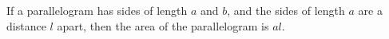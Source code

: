 If a parallelogram has sides of length $a$ and $b$, and the sides of length 
$a$ are a distance $l$ apart, then the area of the parallelogram is $al$.
